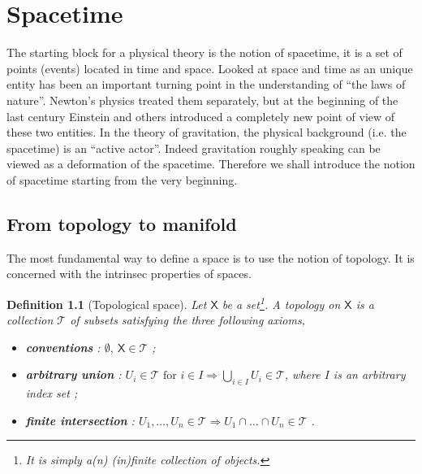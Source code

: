 \documentclass[10pt]{book}
\newcommand{\Tcal}{\mathcal{T}}
\newcommand{\Xsf}{\mathsf{X}}
\theoremstyle{break}
\newtheorem{definition}{Definition}
\begin{document}
\chapter{Spacetime}


The starting block for a physical theory is the notion of spacetime, it is a set of points (events) located in time and space. Looked at space and time as an unique entity has been an important turning point in the understanding of ``the laws of nature''. Newton's physics treated them separately, but at the beginning of the last century Einstein and others introduced a completely new point of view of these two entities. In the theory of gravitation, the physical background (i.e. the spacetime) is an ``active actor''. Indeed gravitation roughly speaking can be viewed as a deformation of the spacetime. Therefore we shall introduce the notion of spacetime starting from the very beginning.


\section{From topology to manifold}

The most fundamental way to define a space is to use the notion of topology. It is concerned with the intrinsec properties of spaces.

\begin{definition}[Topological space] 
Let $\Xsf$ be a set\footnote{It is simply a(n) (in)finite collection of objects.}. A topology on $\Xsf$ is a collection $\Tcal$ of subsets satisfying the three following axioms,%
%
\begin{itemize}
\item \textbf{conventions} : $\emptyset , \ \Xsf \in \Tcal$ ;
\item \textbf{arbitrary union} : $U_i \in \Tcal \mbox{ for } i \in I \Longrightarrow \bigcup_{i\in I} U_i \in \Tcal$, where $I$ is an arbitrary index set ;
\item \textbf{finite intersection} : $U_1 , \dots , U_n \in \Tcal \Longrightarrow U_1 \cap \dots \cap U_n \in \Tcal$ .
\end{itemize}
%
\end{definition}
\end{document}
